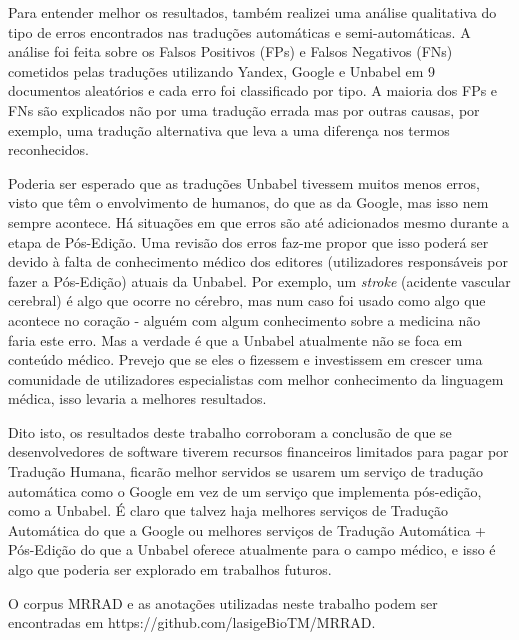 \begin{abstractspt}
Para entender melhor os resultados, também realizei uma análise qualitativa do tipo de erros encontrados nas traduções automáticas e semi-automáticas. A análise foi feita sobre os Falsos Positivos (FPs) e Falsos Negativos (FNs) cometidos pelas traduções utilizando Yandex, Google e Unbabel em 9 documentos aleatórios e cada erro foi classificado por tipo. A maioria dos FPs e FNs são explicados não por uma tradução errada mas por outras causas, por exemplo, uma tradução alternativa que leva a uma diferença nos termos reconhecidos. 

Poderia ser esperado que as traduções Unbabel tivessem muitos menos erros, visto que têm o envolvimento de humanos, do que as da Google, mas isso nem sempre acontece. Há situações em que erros são até adicionados mesmo durante a etapa de Pós-Edição. Uma revisão dos erros faz-me propor que isso poderá ser devido à falta de conhecimento médico dos editores (utilizadores responsáveis por fazer a Pós-Edição) atuais da Unbabel. Por exemplo, um \textit{stroke} (acidente vascular cerebral) é algo que ocorre no cérebro, mas num caso foi usado como algo que acontece no coração - alguém com algum conhecimento sobre a medicina não faria este erro. Mas a verdade é que a Unbabel atualmente não se foca em conteúdo médico. Prevejo que se eles o fizessem e investissem em crescer uma comunidade de utilizadores especialistas com melhor conhecimento da linguagem médica, isso levaria a melhores resultados.

Dito isto, os resultados deste trabalho corroboram a conclusão de que se desenvolvedores de software tiverem recursos financeiros limitados para pagar por Tradução Humana, ficarão melhor servidos se usarem um serviço de tradução automática como o Google em vez de um serviço que implementa pós-edição, como a Unbabel. É claro que talvez haja melhores serviços de Tradução Automática do que a Google ou melhores serviços de Tradução Automática + Pós-Edição do que a Unbabel oferece atualmente para o campo médico, e isso é algo que poderia ser explorado em trabalhos futuros.

O corpus MRRAD e as anotações utilizadas neste trabalho podem ser encontradas em https://github.com/lasigeBioTM/MRRAD.

\end{abstractspt}

